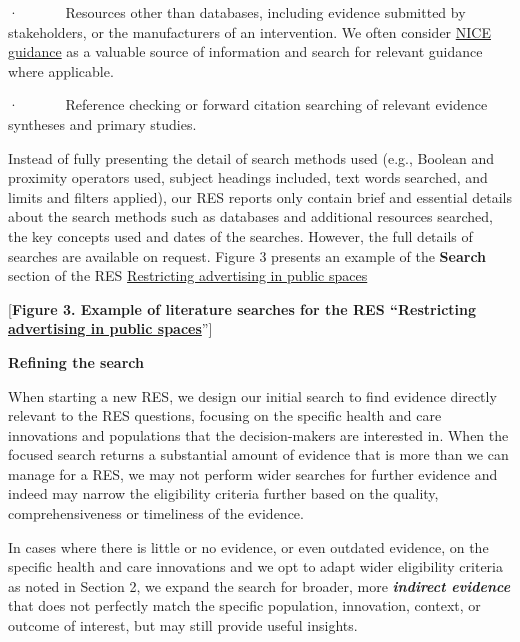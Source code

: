 \documentclass[
  letterpaper,
  DIV=11,
  numbers=noendperiod]{scrreprt}
\begin{document}
·~~~~~~ Resources other than databases, including evidence submitted by
stakeholders, or the manufacturers of an intervention. We often consider
\href{https://www.nice.org.uk/guidance}{NICE guidance} as a valuable
source of information and search for relevant guidance where applicable.

·~~~~~~ Reference checking or forward citation searching of relevant
evidence syntheses and primary studies.

Instead of fully presenting the detail of search methods used (e.g.,
Boolean and proximity operators used, subject headings included, text
words searched, and limits and filters applied), our RES reports only
contain brief and essential details about the search methods such as
databases and additional resources searched, the key concepts used and
dates of the searches. However, the full details of searches are
available on request. Figure 3 presents an example of the
\textbf{Search} section of the RES
\href{https://arc-gm.nihr.ac.uk/media/Resources/ARC/Evaluation/RES/Implementing\%20policies\%20that\%20restrict\%20the\%20use\%20of\%20outdoor\%20spaces\%20for\%20advertising\%20harmful\%20commodities/ARC-GM\%20RES\%20outdoor\%20advertising\%20harmful\%20commodities\%20revised.pdf}{Restricting
advertising in public spaces}

{[}\textbf{Figure 3. Example of literature searches for the RES
``Restricting
\href{https://arc-gm.nihr.ac.uk/media/Resources/ARC/Evaluation/RES/Implementing\%20policies\%20that\%20restrict\%20the\%20use\%20of\%20outdoor\%20spaces\%20for\%20advertising\%20harmful\%20commodities/ARC-GM\%20RES\%20outdoor\%20advertising\%20harmful\%20commodities\%20revised.pdf}{advertising
in public spaces}}''{]}

\textbf{Refining the search}

When starting a new RES, we design our initial search to find evidence
directly relevant to the RES questions, focusing on the specific health
and care innovations and populations that the decision-makers are
interested in. When the focused search returns a substantial amount of
evidence that is more than we can manage for a RES, we may not perform
wider searches for further evidence and indeed may narrow the
eligibility criteria further based on the quality, comprehensiveness or
timeliness of the evidence.

In cases where there is little or no evidence, or even outdated
evidence, on the specific health and care innovations and we opt to
adapt wider eligibility criteria as noted in Section 2, we expand the
search for broader, more \textbf{\emph{indirect evidence}} that does not
perfectly match the specific population, innovation, context, or outcome
of interest, but may still provide useful insights.
\end{document}
